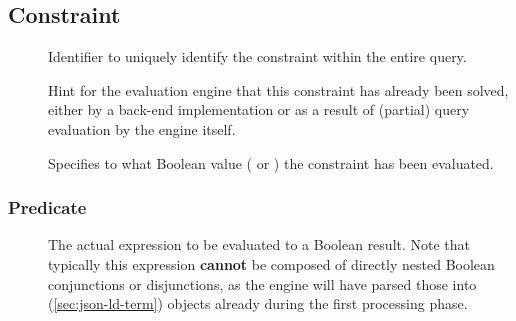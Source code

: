 \documentclass[11pt,a4paper]{article}
\begin{document}
\subsection{Constraint}
\label{sec:json-ld-constraint}
\begin{attributes}{}
\end{attributes}
\begin{description}
	\item[] Identifier to uniquely identify the constraint within the entire query.
	\item[] Hint for the evaluation engine that this constraint has already been solved, either by a back-end implementation or as a result of (partial) query evaluation by the engine itself.
	\item[] Specifies to what Boolean value ( or ) the constraint has been evaluated.
\end{description}

\subsubsection{Predicate}
\label{sec:json-ld-predicate}
\begin{elements}{}
\end{elements}
\begin{description}
	\item[] The actual expression to be evaluated to a Boolean result. Note that typically this expression \textbf{cannot} be composed of directly nested Boolean conjunctions or disjunctions, as the engine will have parsed those into  (\ref{sec:json-ld-term}) objects already during the first processing phase.
\end{description}
\end{document}
